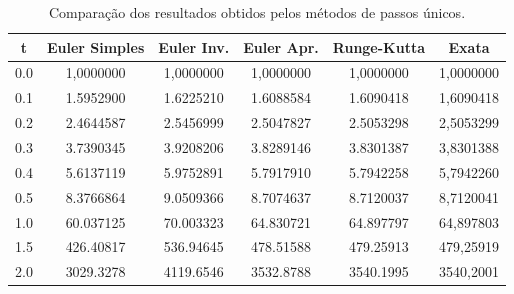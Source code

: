 \documentclass{article}
\begin{document}
\begin{otherlanguage}{brazil}
    \begin{table}[!htbp] 
    \centering
     \begin{tabular}{||c c c c c c||}
     \hline
     t & Euler Simples & Euler Inv. & Euler Apr. & Runge-Kutta & Exata \\ [0.5ex] 
     \hline\hline
     0.0 & 1,0000000 & 1,0000000 & 1,0000000 & 1,0000000 & 1,0000000 \\
     0.1 & 1.5952900 & 1.6225210 & 1.6088584 & 1.6090418 & 1,6090418 \\ 
     0.2 & 2.4644587 & 2.5456999 & 2.5047827 & 2.5053298 & 2,5053299 \\
     0.3 & 3.7390345 & 3.9208206 & 3.8289146 & 3.8301387 & 3,8301388 \\
     0.4 & 5.6137119 & 5.9752891 & 5.7917910 & 5.7942258 & 5,7942260 \\
     0.5 & 8.3766864 & 9.0509366 & 8.7074637 & 8.7120037 & 8,7120041 \\
     1.0 & 60.037125 & 70.003323 & 64.830721 & 64.897797 & 64,897803 \\
     1.5 & 426.40817 & 536.94645 & 478.51588 & 479.25913 & 479,25919 \\
     2.0 & 3029.3278 & 4119.6546 & 3532.8788 & 3540.1995 & 3540,2001 \\ [1ex]
     \hline
     \end{tabular}
     \caption{Comparação dos resultados obtidos pelos métodos de passos únicos.}
     \label{table:1}
    \end{table}
    

\end{otherlanguage}
\end{document}
